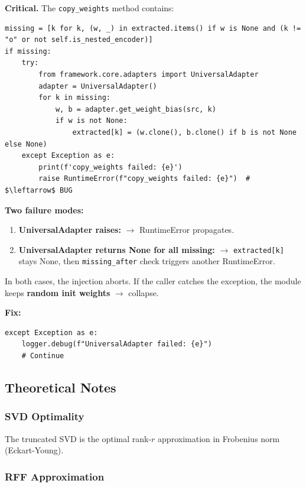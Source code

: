 \textbf{Critical.} The \texttt{copy\_weights} method contains:

\begin{lstlisting}
missing = [k for k, (w, _) in extracted.items() if w is None and (k != "o" or not self.is_nested_encoder)]
if missing:
    try:
        from framework.core.adapters import UniversalAdapter
        adapter = UniversalAdapter()
        for k in missing:
            w, b = adapter.get_weight_bias(src, k)
            if w is not None:
                extracted[k] = (w.clone(), b.clone() if b is not None else None)
    except Exception as e:
        print(f'copy_weights failed: {e}')
        raise RuntimeError(f"copy_weights failed: {e}")  # $\leftarrow$ BUG
\end{lstlisting}

\textbf{Two failure modes:}

\begin{enumerate}
\item \textbf{UniversalAdapter raises:} $\to$ RuntimeError propagates.
\item \textbf{UniversalAdapter returns None for all missing:} $\to$ \texttt{extracted[k]} stays None, then \texttt{missing\_after} check triggers another RuntimeError.

\end{enumerate}
In both cases, the injection aborts. If the caller catches the exception, 
the module keeps \textbf{random init weights} $\to$ collapse.

\textbf{Fix:}

\begin{lstlisting}
except Exception as e:
    logger.debug(f"UniversalAdapter failed: {e}")
    # Continue
\end{lstlisting}

\subsection{Theoretical Notes}

\subsubsection{SVD Optimality}

The truncated SVD is the optimal rank-$r$ approximation in Frobenius norm 
(Eckart-Young).

\subsubsection{RFF Approximation}

